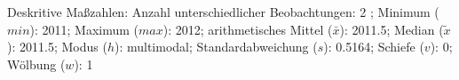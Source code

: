                     \begin{noten}
                	    \note{} Deskritive Maßzahlen:
                	    Anzahl unterschiedlicher Beobachtungen: 2%
                	    ; 
                	      Minimum ($min$): 2011; 
                	      Maximum ($max$): 2012; 
                	      arithmetisches Mittel ($\bar{x}$): \num[round-mode=places,round-precision=2]{2011,5}; 
                	      Median ($\tilde{x}$): 2011.5; 
                	      Modus ($h$): multimodal; 
                	      Standardabweichung ($s$): \num[round-mode=places,round-precision=2]{0,5164}; 
                	      Schiefe ($v$): \num[round-mode=places,round-precision=2]{0}; 
                	      Wölbung ($w$): \num[round-mode=places,round-precision=2]{1}
                     \end{noten}


